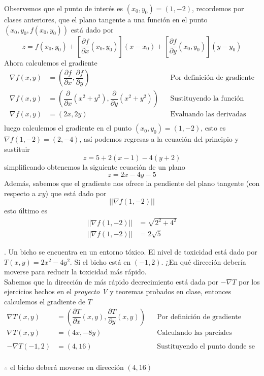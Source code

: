\documentclass[letterpaper]{article}
\renewcommand{\d}{\partial}
\providecommand{\norm}[1]{\left|\left|#1\right|\right|}
\renewcommand{\*}{\cdot}
\theoremstyle{definition}
\begin{document}
Observemos que el punto de interés es $ (x_0, y_0) = (1,-2) $, recordemos por clases anteriores, que el plano tangente a una función en el punto $ (x_0, y_0, f(x_0,y_0)) $ está dado por
\[ z = f(x_0, y_0) + \left[ \dfrac{\d f}{\d x}(x_0,y_0) \right] (x - x_0) + \left[ \dfrac{\d f}{\d y}(x_0, y_0)\right](y - y_0) \]
Ahora calculemos el gradiente
\begin{align*}
	\nabla f(x,y) &= \left( \dfrac{\d f}{\d x},\dfrac{\d f}{\d y} \right) && \text{Por definición de gradiente}\\
	\nabla f(x,y) &= \left( \dfrac{\d }{\d x} (x^2 + y^2),\dfrac{\d}{\d y} (x^2 + y^2) \right) && \text{Sustituyendo la función }\\
	\nabla f(x,y) &= \left( 2x, 2y \right) && \text{Evaluando las derivadas}\\
\end{align*}
luego calculemos el gradiente en el punto $(x_0, y_0) = (1,-2) $, esto es $ \nabla f(1,-2) = (2,-4) $, así podemos regresas a la ecuación del principio y sustituir
\[ z = 5+ 2(x - 1) - 4(y+2) \]
simplificando obtenemos la siguiente ecuación de un plano
\[ z = 2x -4y -5 \]
Además, sabemos que el gradiente nos ofrece la pendiente del plano tangente (con respecto a $ xy $) que está dado por $$ \norm{\nabla f(1,-2)} $$esto último es 
\begin{align*}
	\norm{\nabla f(1,-2)} &= \sqrt{2^2 + 4^2}\\
	\norm{\nabla f(1,-2)} &= 2\sqrt{5}
\end{align*}


. Un bicho se encuentra en un entorno tóxico. El nivel de toxicidad está dado por $ T(x,y) = 2x^2 - 4y^2 $. Si el bicho está en $ (-1,2) $. ¿En qué dirección debería moverse para reducir la toxicidad más rápido.\\

Sabemos que la dirección de más rápido decrecimiento está dada por $ - \nabla T $ por los ejercicios hechos en el \textit{proyecto V} y teoremas probados en clase, entonces calculemos el gradiente de $ T $
\begin{align*}
	\nabla T (x,y) &= \left( \dfrac{\d T}{\d x}(x,y),\dfrac{\d T}{\d y}(x,y)  \right) &&\text{Por definición de gradiente}\\
	\nabla T (x,y) &= \left( 4x,-8y  \right) &&\text{Calculando las parciales}\\
	\\
	-\nabla T (-1,2) &= (4,16) &&\text{Sustituyendo el punto donde se encuentra el bicho}\\
\end{align*}
\begin{center}
	$ \therefore $ el bicho deberá moverse en dirección $ (4,16)$
\end{center}
\end{document}
